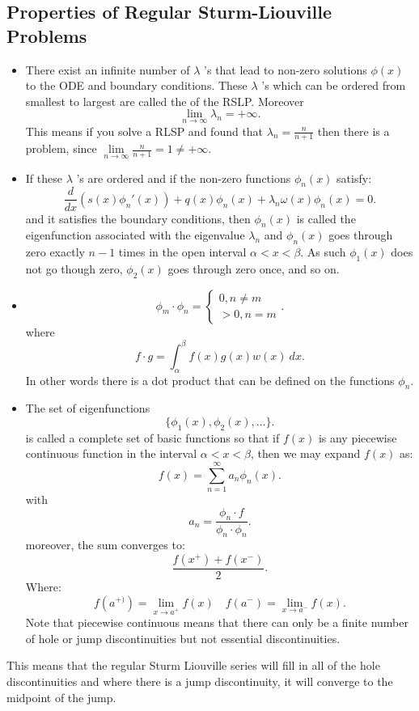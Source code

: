 \documentclass[../main/main.tex]{subfiles}
\begin{document}
\subsection{Properties of Regular Sturm-Liouville Problems}
\begin{itemize}
	\item There exist an infinite number of $\lambda$ 's that lead to non-zero solutions $\phi(x)$ to the ODE and boundary conditions. These $\lambda$ 's which can be ordered from smallest to largest are called the  of the RSLP. Moreover \[
	\lim\limits_{n \to \infty} \lambda_n = +\infty
	.\] 
This means if you solve a RLSP and found that $\lambda_n = \frac{n}{n+1}$ then there is a problem, since $\lim\limits_{n \to \infty} \frac{n}{n+1}=1\neq +\infty$.
\item If these $\lambda$ 's are ordered and if the non-zero functions $\phi_n(x)$ satisfy: \[
		\frac{d}{dx}\left( s(x) \phi_n'(x) \right) + q(x) \phi_n(x) + \lambda_n \omega(x) \phi_n(x) = 0 
	.\] and it satisfies the boundary conditions, then $\phi_n(x)$ is called the eigenfunction associated with the eigenvalue $\lambda_n$ and $\phi_n(x)$ goes through zero exactly $n-1$ times in the open interval $\alpha<x<\beta$. As such  $\phi_1(x)$ does not go though zero, $\phi_2(x)$ goes through zero once, and so on.
\item \[
		\phi_m\cdot \phi_n = \begin{cases}
			0 , n\neq m \\ >0, n=m
		\end{cases}
.\] where \[
f\cdot g = \int^\beta_\alpha f(x) g(x) w(x) ~dx
.\] In other words there is a dot product that can be defined on the functions $\phi_n$.
\item The set of eigenfunctions  \[
		\{\phi_1(x),\phi_2(x),\ldots\} 
	.\] is called a complete set of basic functions so that if $f(x) $ is any piecewise continuous function in the interval $\alpha<x<\beta$, then we may expand  $f(x) $ as: \[
	f(x) = \sum_{n=1}^{\infty} a_n \phi_n(x)
	.\] with \[
	a_n = \frac{\phi_n \cdot f}{\phi_n \cdot  \phi_n}
	.\] moreover, the sum converges to: \[
	\frac{f(x^{+})+f(x^{-})}{2}
	.\] Where: \[
	f(a^{+)}) = \lim\limits_{x \to a^+} f(x) \quad f(a^{-}) = \lim\limits_{x \to a^-} f(x)
.\] Note that piecewise continuous means that there can only be a finite number of hole or jump discontinuities but not essential discontinuities.
\end{itemize}
\begin{remark}
	This means that the regular Sturm Liouville series will fill in all of the hole discontinuities and where there is a jump discontinuity, it will converge to the midpoint of the jump.
\end{remark}
\end{document}
